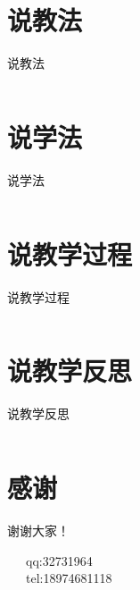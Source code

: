 \documentclass[utf8,zihao=-4]{ctexbeamer}
\begin{document}
\section{说教法}
\begin{frame}{说教法}
    \begin{columns}
        \column{\textwidth}
    \end{columns}
\end{frame}


\section{说学法}
\begin{frame}{说学法}
    \begin{columns}
        \column{\textwidth}
    \end{columns}
\end{frame}

\section{说教学过程}
\begin{frame}{说教学过程}
    \begin{columns}
        \column{\textwidth}
    \end{columns}
\end{frame}


\section{说教学反思}
\begin{frame}{说教学反思}
    \begin{columns}
        \column{\textwidth}
    \end{columns}
\end{frame}




\section*{感谢}
\begin{frame}[plain]
\vfill

\centering \huge 谢谢大家！

\vfill

\flushleft \footnotesize   
~~~qq:32731964\\
~~~tel:18974681118\\

\end{frame}
\end{document}
